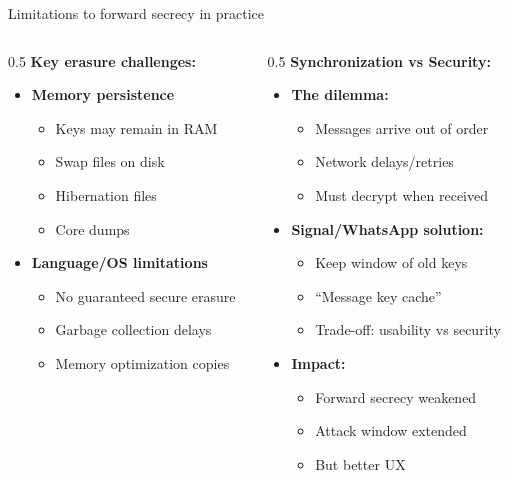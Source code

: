 \ifdefined\PRESENTATION\else\PassOptionsToClass{handout}{beamer}\fi\documentclass[aspectratio=169, lualatex]{beamer}
\begin{document}
\begin{frame}{Limitations to forward secrecy in practice}
	\begin{columns}[c]
		\begin{column}{0.5\textwidth}
			\textbf{Key erasure challenges:}
			\begin{itemize}
				\item \textbf{Memory persistence}
				      \begin{itemize}
					      \item Keys may remain in RAM
					      \item Swap files on disk
					      \item Hibernation files
					      \item Core dumps
				      \end{itemize}
				\item \textbf{Language/OS limitations}
				      \begin{itemize}
					      \item No guaranteed secure erasure
					      \item Garbage collection delays
					      \item Memory optimization copies
				      \end{itemize}
			\end{itemize}
		\end{column}
		\begin{column}{0.5\textwidth}
			\textbf{Synchronization vs Security:}
			\begin{itemize}
				\item \textbf{The dilemma:}
				      \begin{itemize}
					      \item Messages arrive out of order
					      \item Network delays/retries
					      \item Must decrypt when received
				      \end{itemize}
				\item \textbf{Signal/WhatsApp solution:}
				      \begin{itemize}
					      \item Keep window of old keys
					      \item ``Message key cache''
					      \item Trade-off: usability vs security
				      \end{itemize}
				\item \textbf{Impact:}
				      \begin{itemize}
					      \item Forward secrecy weakened
					      \item Attack window extended
					      \item But better UX
				      \end{itemize}
			\end{itemize}
		\end{column}
	\end{columns}
\end{frame}
\end{document}
